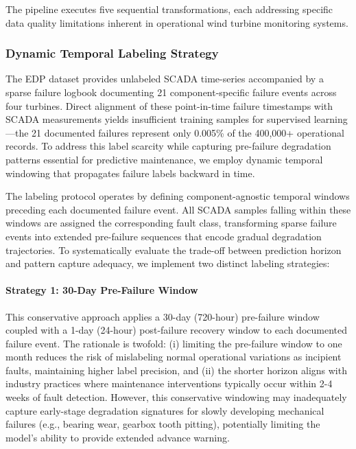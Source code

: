 \documentclass[12pt]{article}
\begin{document}
The pipeline executes five sequential transformations, each addressing specific data quality limitations inherent in operational wind turbine monitoring systems.

\subsubsection{Dynamic Temporal Labeling Strategy}
\label{subsubsec:temporal_labeling}

The EDP dataset provides unlabeled SCADA time-series accompanied by a sparse failure logbook documenting 21 component-specific failure events across four turbines. Direct alignment of these point-in-time failure timestamps with SCADA measurements yields insufficient training samples for supervised learning—the 21 documented failures represent only 0.005\% of the 400,000+ operational records. To address this label scarcity while capturing pre-failure degradation patterns essential for predictive maintenance, we employ dynamic temporal windowing that propagates failure labels backward in time.

The labeling protocol operates by defining component-agnostic temporal windows preceding each documented failure event. All SCADA samples falling within these windows are assigned the corresponding fault class, transforming sparse failure events into extended pre-failure sequences that encode gradual degradation trajectories. To systematically evaluate the trade-off between prediction horizon and pattern capture adequacy, we implement two distinct labeling strategies:

\paragraph{Strategy 1: 30-Day Pre-Failure Window}
This conservative approach applies a 30-day (720-hour) pre-failure window coupled with a 1-day (24-hour) post-failure recovery window to each documented failure event. The rationale is twofold: (i) limiting the pre-failure window to one month reduces the risk of mislabeling normal operational variations as incipient faults, maintaining higher label precision, and (ii) the shorter horizon aligns with industry practices where maintenance interventions typically occur within 2-4 weeks of fault detection. However, this conservative windowing may inadequately capture early-stage degradation signatures for slowly developing mechanical failures (e.g., bearing wear, gearbox tooth pitting), potentially limiting the model's ability to provide extended advance warning.
\end{document}
